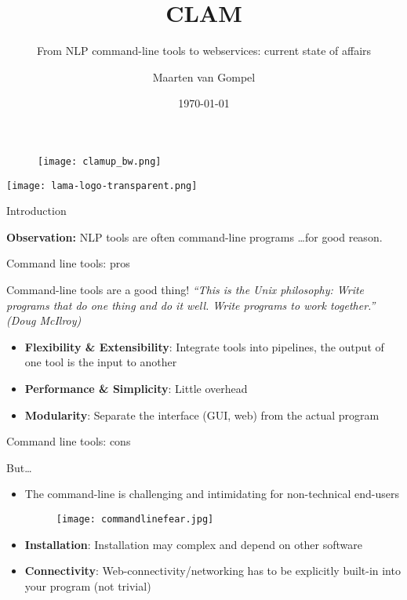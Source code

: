 \documentclass[xcolor=table,10pt,t]{beamer}
\title{CLAM}
\subtitle{From NLP command-line tools to webservices: current state of affairs}
\date{\today}
\author{Maarten van Gompel}
\begin{document}
\begin{frame}
    \titlepage{}
        \begin{figure}
        \texttt{[image: clamup\_bw.png]}
        \end{figure}
        \vspace{3.5cm}
    \texttt{[image: lama-logo-transparent.png]}
\end{frame}



\begin{frame}{Introduction}
  \begin{block}{}
    \textbf{Observation:} NLP tools are often command-line programs \ldots for
    good reason.
  \end{block}
\end{frame}



\begin{frame}{Command line tools: pros}
  \begin{block}{Command-line tools are a good thing!}
      \emph{``This is the Unix philosophy: Write programs that do one thing and do
      it well. Write programs to work together.'' (Doug McIlroy)}

      \medskip

      \begin{itemize}
        \item \textbf{Flexibility \& Extensibility}: Integrate tools into pipelines, the output of one tool is the input to another
        \item \textbf{Performance \& Simplicity}: Little overhead
        \item \textbf{Modularity}: Separate the interface (GUI, web) from the actual program
      \end{itemize}

  \end{block}

\end{frame}


\begin{frame}{Command line tools: cons}
  \begin{block}{But\ldots}
      \begin{itemize}
        \item The command-line is challenging and intimidating for non-technical end-users
        \begin{figure}
            \texttt{[image: commandlinefear.jpg]}
        \end{figure}
        \item \textbf{Installation}: Installation may complex and depend on other software
        \item \textbf{Connectivity}: Web-connectivity/networking has to be
            explicitly built-in into your program (not trivial)
      \end{itemize}
  \end{block}
\end{frame}
\end{document}
